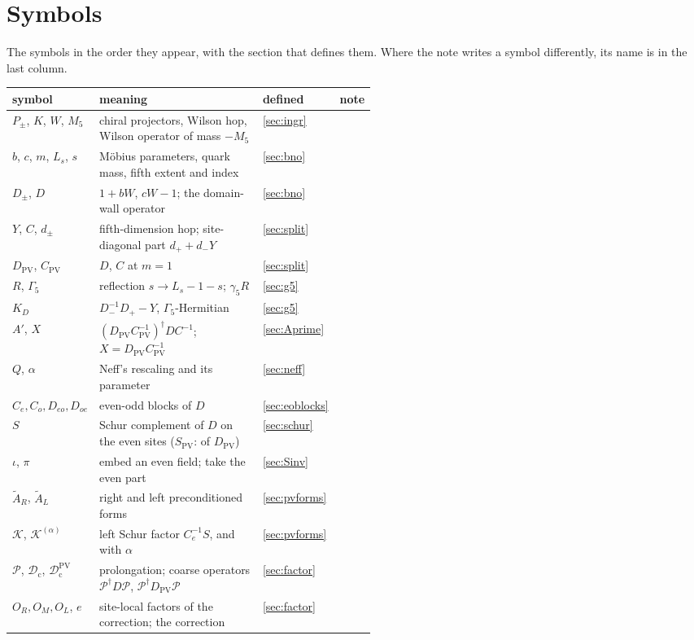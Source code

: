 \documentclass[11pt,a4paper]{article}
\numberwithin{equation}{section}
\newcommand{\dg}{^{\dagger}}
\newcommand{\Dpv}{D_{\mathrm{PV}}}
\newcommand{\Cpv}{C_{\mathrm{PV}}}
\newcommand{\Spv}{S_{\mathrm{PV}}}
\newcommand{\Gfive}{\Gamma_5}
\newcommand{\AR}{\tilde A_{R}}
\newcommand{\AL}{\tilde A_{L}}
\newcommand{\Pro}{\mathcal P}
\newcommand{\Dc}{\mathcal D_{\mathrm c}}
\newcommand{\Dcpv}{\mathcal D_{\mathrm c}^{\mathrm{PV}}}
\newcommand{\Ce}{C_{e}}
\newcommand{\Co}{C_{o}}
\begin{document}
\tableofcontents

\section*{Symbols}
The symbols in the order they appear, with the section that defines them. Where the note writes
a symbol differently, its name is in the last column.
\begin{center}
\small
\begin{tabular}{@{}lp{0.52\linewidth}lc@{}}
\toprule
symbol & meaning & defined & note\\
\midrule
$P_\pm$, $K$, $W$, $M_5$ & chiral projectors, Wilson hop, Wilson operator of mass $-M_5$ & \ref{sec:ingr} & \\
$b$, $c$, $m$, $L_s$, $s$ & M\"obius parameters, quark mass, fifth extent and index & \ref{sec:bno} & \\
$D_\pm$, $D$ & $1+bW$, $cW-1$; the domain-wall operator & \ref{sec:bno} & \\
$Y$, $C$, $d_\pm$ & fifth-dimension hop; site-diagonal part $d_++d_-Y$ & \ref{sec:split} & \\
$\Dpv$, $\Cpv$ & $D$, $C$ at $m=1$ & \ref{sec:split} & \\
$R$, $\Gfive$ & reflection $s\to L_s-1-s$; $\gamma_5R$ & \ref{sec:g5} & \\
$K_D$ & $D_-^{-1}D_+-Y$, $\Gfive$-Hermitian & \ref{sec:g5} & \\
$A'$, $X$ & $(\Dpv\Cpv^{-1})\dg DC^{-1}$; $X=\Dpv\Cpv^{-1}$ & \ref{sec:Aprime} & \\
$Q$, $\alpha$ & Neff's rescaling and its parameter & \ref{sec:neff} & \\
$\Ce,\Co,D_{eo},D_{oe}$ & even-odd blocks of $D$ & \ref{sec:eoblocks} & \\
$S$ & Schur complement of $D$ on the even sites ($\Spv$: of $\Dpv$) & \ref{sec:schur} & \\
$\iota$, $\pi$ & embed an even field; take the even part & \ref{sec:Sinv} & \\
$\AR$, $\AL$ & right and left preconditioned forms & \ref{sec:pvforms} & \\
$\mathcal K$, $\mathcal K^{(\alpha)}$ & left Schur factor $\Ce^{-1}S$, and with $\alpha$ & \ref{sec:pvforms} & \\
$\Pro$, $\Dc$, $\Dcpv$ & prolongation; coarse operators $\Pro\dg D\Pro$, $\Pro\dg\Dpv\Pro$ & \ref{sec:factor} & \\
$O_R,O_M,O_L$, $e$ & site-local factors of the correction; the correction & \ref{sec:factor} & \\

\end{tabular}
\end{center}
\end{document}
